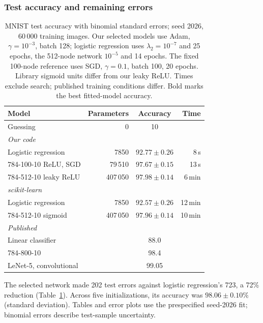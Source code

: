 \documentclass[aps,prb,reprint,superscriptaddress,nofootinbib,longbibliography,floatfix]{revtex4-2}
\begin{document}
\subsubsection{Test accuracy and remaining errors}\label{sec:res_mnist_test}
\begin{table}[tb]
\caption{MNIST test accuracy with binomial standard errors; seed 2026, 60\,000 training images. Our selected models use Adam, $\gamma=10^{-3}$, batch 128; logistic regression uses $\lambda_2=10^{-7}$ and 25 epochs, the 512-node network $10^{-5}$ and 14 epochs. The fixed 100-node reference uses SGD, $\gamma=0.1$, batch 100, 20 epochs. Library sigmoid units differ from our leaky ReLU. Times exclude search; published training conditions differ. Bold marks the best fitted-model accuracy.}\label{tab:mnist}
\begin{ruledtabular}
\begin{tabular}{lrcr}
Model & Parameters & Accuracy & Time \\ \hline
Guessing & 0 & 10 & \\[3pt]
\multicolumn{4}{l}{\emph{Our code}} \\
Logistic regression & 7850 & $92.77\pm0.26$ & 8\,s \\
784-100-10 ReLU, SGD & 79\,510 & $97.67\pm0.15$ & 13\,s \\
784-512-10 leaky ReLU & 407\,050 & $\bm{97.98\pm0.14}$ & 6\,min \\[3pt]
\multicolumn{4}{l}{\emph{scikit-learn}} \\
Logistic regression & 7850 & $92.57\pm0.26$ & 12\,min \\
784-512-10 sigmoid & 407\,050 & $97.96\pm0.14$ & 10\,min \\[3pt]
\multicolumn{4}{l}{\emph{Published}} \\
Linear classifier & & 88.0 & \\
784-800-10 & & 98.4 & \\
LeNet-5, convolutional & & 99.05 & \\
\end{tabular}
\end{ruledtabular}
\end{table}

The selected network made 202 test errors against logistic regression's 723, a 72\% reduction (Table~\ref{tab:mnist}). Across five initializations, its accuracy was $98.06\pm0.10\%$ (standard deviation). Tables and error plots use the prespecified seed-2026 fit; binomial errors describe test-sample uncertainty.
\end{document}
